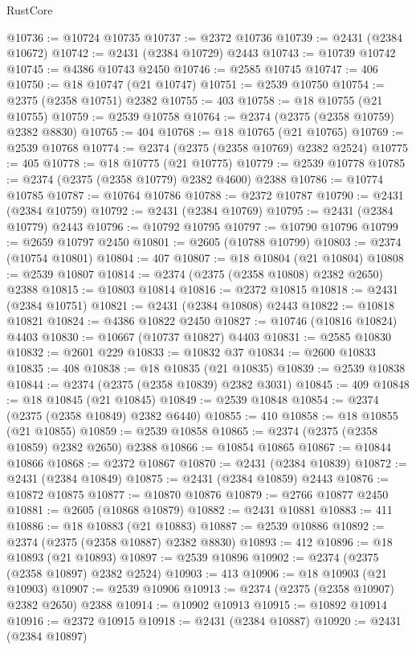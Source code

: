 \begin{lexlean}{RustCore}
\begin{coremodule}
@10736 := @10724 @10735
@10737 := @2372 @10736
@10739 := @2431 (@2384 @10672)
@10742 := @2431 (@2384 @10729) @2443
@10743 := @10739 @10742
@10745 := @4386 @10743 @2450
@10746 := @2585 @10745
@10747 := 406
@10750 := @18 @10747 (@21 @10747)
@10751 := @2539 @10750
@10754 := @2375 (@2358 @10751) @2382
@10755 := 403
@10758 := @18 @10755 (@21 @10755)
@10759 := @2539 @10758
@10764 := @2374 (@2375 (@2358 @10759) @2382 @8830)
@10765 := 404
@10768 := @18 @10765 (@21 @10765)
@10769 := @2539 @10768
@10774 := @2374 (@2375 (@2358 @10769) @2382 @2524)
@10775 := 405
@10778 := @18 @10775 (@21 @10775)
@10779 := @2539 @10778
@10785 := @2374 (@2375 (@2358 @10779) @2382 @4600) @2388
@10786 := @10774 @10785
@10787 := @10764 @10786
@10788 := @2372 @10787
@10790 := @2431 (@2384 @10759)
@10792 := @2431 (@2384 @10769)
@10795 := @2431 (@2384 @10779) @2443
@10796 := @10792 @10795
@10797 := @10790 @10796
@10799 := @2659 @10797 @2450
@10801 := @2605 (@10788 @10799)
@10803 := @2374 (@10754 @10801)
@10804 := 407
@10807 := @18 @10804 (@21 @10804)
@10808 := @2539 @10807
@10814 := @2374 (@2375 (@2358 @10808) @2382 @2650) @2388
@10815 := @10803 @10814
@10816 := @2372 @10815
@10818 := @2431 (@2384 @10751)
@10821 := @2431 (@2384 @10808) @2443
@10822 := @10818 @10821
@10824 := @4386 @10822 @2450
@10827 := @10746 (@10816 @10824) @4403
@10830 := @10667 (@10737 @10827) @4403
@10831 := @2585 @10830
@10832 := @2601 @229
@10833 := @10832 @37
@10834 := @2600 @10833
@10835 := 408
@10838 := @18 @10835 (@21 @10835)
@10839 := @2539 @10838
@10844 := @2374 (@2375 (@2358 @10839) @2382 @3031)
@10845 := 409
@10848 := @18 @10845 (@21 @10845)
@10849 := @2539 @10848
@10854 := @2374 (@2375 (@2358 @10849) @2382 @6440)
@10855 := 410
@10858 := @18 @10855 (@21 @10855)
@10859 := @2539 @10858
@10865 := @2374 (@2375 (@2358 @10859) @2382 @2650) @2388
@10866 := @10854 @10865
@10867 := @10844 @10866
@10868 := @2372 @10867
@10870 := @2431 (@2384 @10839)
@10872 := @2431 (@2384 @10849)
@10875 := @2431 (@2384 @10859) @2443
@10876 := @10872 @10875
@10877 := @10870 @10876
@10879 := @2766 @10877 @2450
@10881 := @2605 (@10868 @10879)
@10882 := @2431 @10881
@10883 := 411
@10886 := @18 @10883 (@21 @10883)
@10887 := @2539 @10886
@10892 := @2374 (@2375 (@2358 @10887) @2382 @8830)
@10893 := 412
@10896 := @18 @10893 (@21 @10893)
@10897 := @2539 @10896
@10902 := @2374 (@2375 (@2358 @10897) @2382 @2524)
@10903 := 413
@10906 := @18 @10903 (@21 @10903)
@10907 := @2539 @10906
@10913 := @2374 (@2375 (@2358 @10907) @2382 @2650) @2388
@10914 := @10902 @10913
@10915 := @10892 @10914
@10916 := @2372 @10915
@10918 := @2431 (@2384 @10887)
@10920 := @2431 (@2384 @10897)

\end{coremodule}
\end{lexlean}
